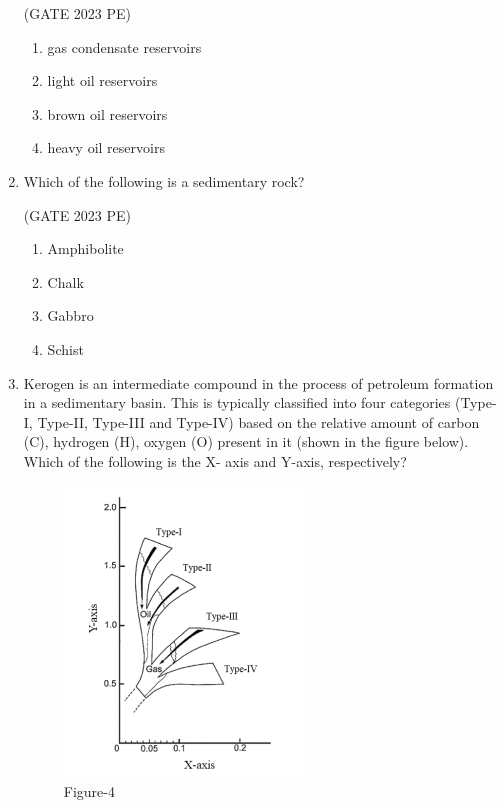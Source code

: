 \documentclass[journal,12pt,onecolumn]{exam}
\theoremstyle{remark}
\begin{document}
\begin{enumerate}
\hfill{(GATE 2023 PE)}\\
\begin{enumerate}
    \item gas condensate reservoirs
    \item light oil reservoirs
    \item brown oil reservoirs
    \item heavy oil reservoirs
\end{enumerate}
\item Which of the following is a sedimentary rock?

\hfill{(GATE 2023 PE)}\\
\begin{enumerate}
    \item Amphibolite
    \item Chalk
    \item Gabbro
    \item Schist
\end{enumerate}
\item Kerogen is an intermediate compound in the process of petroleum formation in a
sedimentary basin. This is typically classified into four categories (Type-I, Type-II,
Type-III and Type-IV) based on the relative amount of carbon (C), hydrogen (H),
oxygen (O) present in it (shown in the figure below).
Which of the following is the X- axis and Y-axis, respectively?
\begin{figure}[H]
    \centering
    \includegraphics[width=0.5\linewidth]{figs/fig4.png}
    \caption{Figure-4}
    \label{fig:figs/fig4.png}
\end{figure}


\end{enumerate}
\end{document}
